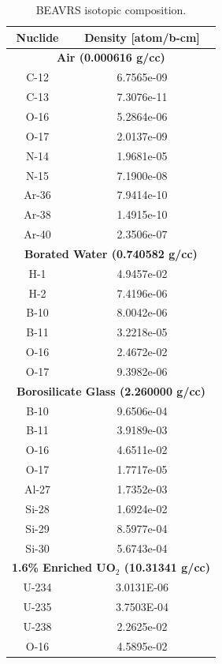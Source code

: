 \begin{table}[h!]
  \centering
  \caption[BEAVRS isotopic composition]{BEAVRS isotopic composition.}
  \tiny
  \label{table:chap7-beavrs-isotopes} 
  \vspace{6pt}
  \begin{tabular}{c c}
  \toprule
  \rowcolor{lightgray}
  {\bf Nuclide} &
  {\bf Density [atom/b-cm]} \\
  \midrule
  \multicolumn{2}{c}{\bf Air (0.000616 g/cc)} \\
  \midrule
  C-12 & 6.7565e-09 \\
  C-13 & 7.3076e-11 \\
  O-16 & 5.2864e-06 \\
  O-17 & 2.0137e-09 \\
  N-14 & 1.9681e-05 \\
  N-15 & 7.1900e-08 \\
  Ar-36 & 7.9414e-10 \\
  Ar-38 & 1.4915e-10 \\
  Ar-40 & 2.3506e-07 \\
  \midrule
  \multicolumn{2}{c}{\bf Borated Water (0.740582 g/cc)} \\
  \midrule
  H-1 & 4.9457e-02 \\
  H-2 & 7.4196e-06 \\
  B-10 & 8.0042e-06 \\
  B-11 & 3.2218e-05 \\
  O-16 & 2.4672e-02 \\
  O-17 & 9.3982e-06 \\
  \midrule
  \multicolumn{2}{c}{\bf Borosilicate Glass (2.260000 g/cc)} \\
  \midrule
  B-10 & 9.6506e-04 \\
  B-11 & 3.9189e-03 \\
  O-16 & 4.6511e-02 \\
  O-17 & 1.7717e-05 \\
  Al-27 & 1.7352e-03 \\
  Si-28 & 1.6924e-02 \\
  Si-29 & 8.5977e-04 \\
  Si-30 & 5.6743e-04 \\
  \midrule
  \multicolumn{2}{c}{\bf 1.6\% Enriched UO$_2$ (10.31341 g/cc)} \\
  \midrule
  U-234 & 3.0131E-06 \\
  U-235 & 3.7503E-04 \\
  U-238 & 2.2625e-02 \\
  O-16 & 4.5895e-02 \\

\end{tabular}
\end{table}

